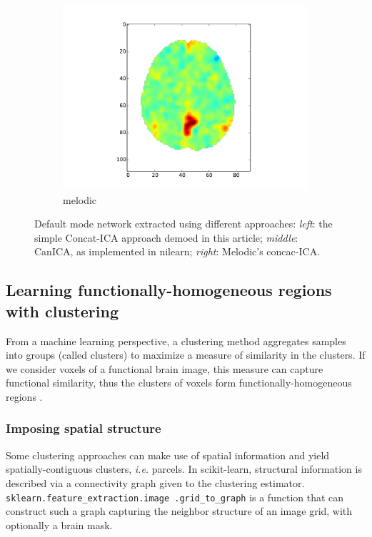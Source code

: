 \documentclass{frontiersSCNS} %
\begin{document}
\begin{figure}[hbtp]
\begin{center}
\begin{subfigure}[b]{.3\linewidth}
        \includegraphics[width=\linewidth]{img/ica/melodic}
        \caption{melodic}
      \end{subfigure}
  \end{center}
  \caption{Default mode network extracted using different approaches:
\emph{left}: the simple Concat-ICA approach demoed in this article;
\emph{middle}: CanICA, as implemented in nilearn; \emph{right}: Melodic's
concac-ICA.}
  \label{fig:ica}
\end{figure}

\subsection{Learning functionally-homogeneous regions with clustering}
\label{clustering}

From a machine learning perspective, a clustering method aggregates 
samples into groups (called clusters) to maximize a measure of similarity in
the clusters. If we consider voxels of a functional brain image, this 
measure can capture functional similarity, thus the clusters of voxels
form functionally-homogeneous regions \citep{thirion2006}.

\subsubsection{Imposing spatial structure}

Some clustering approaches can make use of
spatial information and yield spatially-contiguous clusters, \emph{i.e.}
parcels.
In scikit-learn, structural information is described via a connectivity
graph given to the clustering estimator. 
{\tt sklearn.feature\_extraction.image .grid\_to\_graph} is a function that
can construct such a graph capturing the neighbor structure of an image
grid, with optionally a brain mask.
\end{document}
